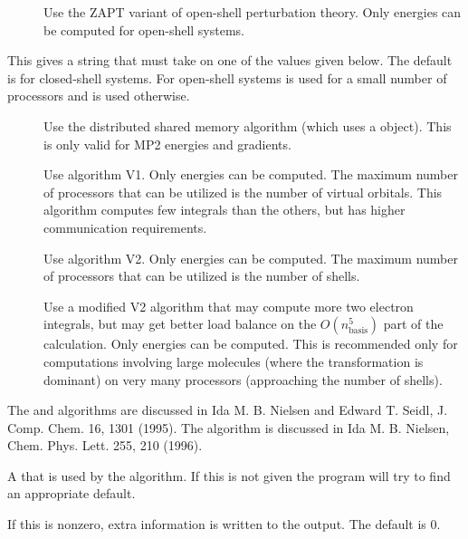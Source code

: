 \begin{description}
\begin{description}
        \item[] Use the ZAPT variant of open-shell perturbation
           theory.  Only energies can be computed for open-shell systems.

     \end{description}

  \item[\keywd{algorithm}] This gives a string that must take on one of the
     values given below.  The default is  for closed-shell
     systems.  For open-shell systems  is used for a small number
     of processors and  is used otherwise.

     \begin{description}

        \item[] Use the distributed shared memory algorithm
          (which uses a  object).  This is only valid
          for MP2 energies and gradients.

        \item[] Use algorithm V1.  Only energies can be
          computed.  The maximum number of processors that can be
          utilized is the number of virtual orbitals.  This algorithm
          computes few integrals than the others, but has higher
          communication requirements.

        \item[] Use algorithm V2.  Only energies can be
          computed.  The maximum number of processors that can be
          utilized is the number of shells.

        \item[] Use a modified V2 algorithm that may
          compute more two electron integrals, but may get better load
          balance on the $O(n_\mathrm{basis}^5)$ part of the
          calculation.  Only energies can be computed.  This is
          recommended only for computations involving large molecules
          (where the transformation is dominant) on very many
          processors (approaching the number of shells).

     \end{description}

     The  and  algorithms are discussed in Ida
     M. B. Nielsen and Edward T. Seidl, J. Comp. Chem. 16, 1301
     (1995).  The  algorithm is discussed in Ida
     M. B. Nielsen, Chem. Phys. Lett. 255, 210 (1996).  

  \item[\keywd{memorygrp}] A 
      that is used by the 
     algorithm.  If this is not given the program will try to find an
     appropriate default.

  \item[\keywd{debug}] If this is nonzero, extra information is written to
     the output.  The default is 0.

\end{description}

